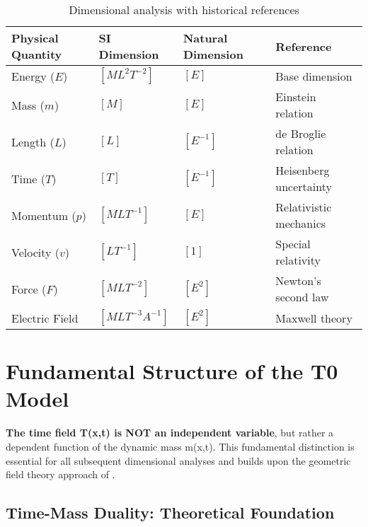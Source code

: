 \documentclass[12pt,a4paper]{article}
\begin{document}
	\begin{table}[htbp]
		\footnotesize
		\centering
		\begin{tabular}{p{3cm}p{2.5cm}p{2cm}p{7cm}}
			\toprule
			\textbf{Physical Quantity} & \textbf{SI Dimension} & \textbf{Natural Dimension} & \textbf{Reference} \\
			\midrule
			Energy ($E$) & $[ML^2T^{-2}]$ & $[E]$ & Base dimension \citep{weinberg1995} \\
			Mass ($m$) & $[M]$ & $[E]$ & Einstein relation \citep{einstein1905} \\
			Length ($L$) & $[L]$ & $[E^{-1}]$ & de Broglie relation \citep{debroglie1924} \\
			Time ($T$) & $[T]$ & $[E^{-1}]$ & Heisenberg uncertainty \citep{heisenberg1927} \\
			Momentum ($p$) & $[MLT^{-1}]$ & $[E]$ & Relativistic mechanics \citep{weinberg1995} \\
			Velocity ($v$) & $[LT^{-1}]$ & $[1]$ & Special relativity \citep{einstein1905} \\
			Force ($F$) & $[MLT^{-2}]$ & $[E^2]$ & Newton's second law \\
			Electric Field & $[MLT^{-3}A^{-1}]$ & $[E^2]$ & Maxwell theory \citep{jackson1998} \\
			\bottomrule
		\end{tabular}
		\caption{Dimensional analysis with historical references}
		\label{tab:dimensions_with_refs}
	\end{table}
	
	\section{Fundamental Structure of the T0 Model}
	\label{sec:fundamental_structure}
	
	\begin{tcolorbox}[colback=red!5!white,colframe=red!75!black,title=Critical Note on Mathematical Structure]
		\textbf{The time field T(x,t) is NOT an independent variable}, but rather a dependent function of the dynamic mass m(x,t). This fundamental distinction is essential for all subsequent dimensional analyses and builds upon the geometric field theory approach of \citet{misner1973}.
	\end{tcolorbox}
	
	\subsection{Time-Mass Duality: Theoretical Foundation}
	\label{subsec:time_mass_duality}
	
\end{document}
